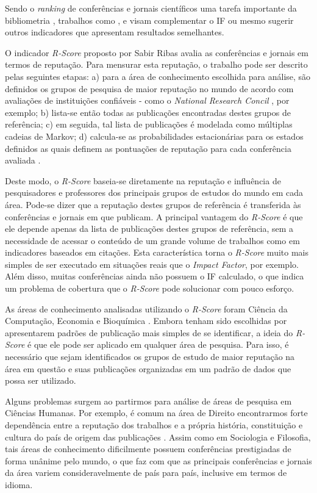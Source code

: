 \documentclass[a4paper,12pt,titlepage]{article}
\begin{document}
Sendo o \textit{ranking} de conferências e jornais científicos uma tarefa importante da bibliometria \cite{biblio}, trabalhos como \cite{mann}, \cite{yan} e \cite{biblio} visam complementar o IF ou mesmo sugerir outros indicadores que apresentam resultados semelhantes.

O indicador \textit{R-Score} proposto por Sabir Ribas avalia as conferências e jornais em termos de reputação. Para mensurar esta reputação, o trabalho pode ser descrito pelas seguintes etapas: a) para a área de conhecimento escolhida para análise, são definidos os grupos de pesquisa de maior reputação no mundo de acordo com avaliações de instituições confiáveis - como o  \textit{National Research Concil} \cite{nrc}, por exemplo; b) lista-se então todas as publicações encontradas destes grupos de referência; c) em seguida, tal lista de publicações é modelada como múltiplas cadeias de Markov; d) calcula-se as probabilidades estacionárias para os estados definidos as quais definem as pontuações de reputação para cada conferência avaliada \cite{sabir}.

Deste modo, o \textit{R-Score} baseia-se diretamente na reputação e influência de pesquisadores e professores dos principais grupos de estudos do mundo em cada área. Pode-se dizer que a reputação destes grupos de referência é transferida às conferências e jornais em que publicam. A principal vantagem do \textit{R-Score} é que ele depende apenas da lista de publicações destes grupos de referência, sem a necessidade de acessar o conteúdo de um grande volume de trabalhos como em indicadores baseados em citações. Esta característica torna o \textit{R-Score} muito mais simples de ser executado em situações reais que o \textit{Impact Factor}, por exemplo. Além disso, muitas conferências ainda não possuem o IF calculado, o que indica um problema de cobertura que o \textit{R-Score} pode solucionar com pouco esforço.

As áreas de conhecimento analisadas utilizando o \textit{R-Score} foram Ciência da Computação, Economia e Bioquímica \cite{sabir}. Embora tenham sido escolhidas por apresentarem padrões de publicação mais simples de se identificar, a ideia do \textit{R-Score} é que ele pode ser aplicado em qualquer área de pesquisa. Para isso, é necessário que sejam identificados os grupos de estudo de maior reputação na área em questão e suas publicações organizadas em um padrão de dados que possa ser utilizado. 

Alguns problemas surgem ao partirmos para análise de áreas de pesquisa em Ciências Humanas. Por exemplo, é comum na área de Direito encontrarmos forte dependência entre a reputação dos trabalhos e a própria história, constituição e cultura do país de origem das publicações \cite{sabir}. Assim como em Sociologia e Filosofia, tais áreas de conhecimento dificilmente possuem conferências prestigiadas de forma unânime pelo mundo, o que faz com que as principais conferências e jornais da área variem consideravelmente de país para país, inclusive em termos de idioma.
\end{document}
